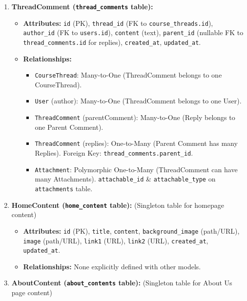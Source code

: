 \begin{enumerate}
\begin{itemize}
\begin{itemize}
        \end{itemize}
    \end{itemize}
    \item \textbf{ThreadComment (\texttt{thread\_comments} table):}
    \begin{itemize}
        \item \textbf{Attributes:} \texttt{id} (PK), \texttt{thread\_id} (FK to \texttt{course\_threads.id}), \texttt{author\_id} (FK to \texttt{users.id}), \texttt{content} (text), \texttt{parent\_id} (nullable FK to \texttt{thread\_comments.id} for replies), \texttt{created\_at}, \texttt{updated\_at}.
        \item \textbf{Relationships:}
        \begin{itemize}
            \item \texttt{CourseThread}: Many-to-One (ThreadComment belongs to one CourseThread).
            \item \texttt{User} (author): Many-to-One (ThreadComment belongs to one User).
            \item \texttt{ThreadComment} (parentComment): Many-to-One (Reply belongs to one Parent Comment).
            \item \texttt{ThreadComment} (replies): One-to-Many (Parent Comment has many Replies). Foreign Key: \texttt{thread\_comments.parent\_id}.
            \item \texttt{Attachment}: Polymorphic One-to-Many (ThreadComment can have many Attachments). \texttt{attachable\_id} \& \texttt{attachable\_type} on \texttt{attachments} table.
        \end{itemize}
    \end{itemize}
    \item \textbf{HomeContent (\texttt{home\_content} table):} (Singleton table for homepage content)
    \begin{itemize}
        \item \textbf{Attributes:} \texttt{id} (PK), \texttt{title}, \texttt{content}, \texttt{background\_image} (path/URL), \texttt{image} (path/URL), \texttt{link1} (URL), \texttt{link2} (URL), \texttt{created\_at}, \texttt{updated\_at}.
        \item \textbf{Relationships:} None explicitly defined with other models.
    \end{itemize}
    \item \textbf{AboutContent (\texttt{about\_contents} table):} (Singleton table for About Us page content)
    \begin{itemize}

\end{itemize}
\end{enumerate}

